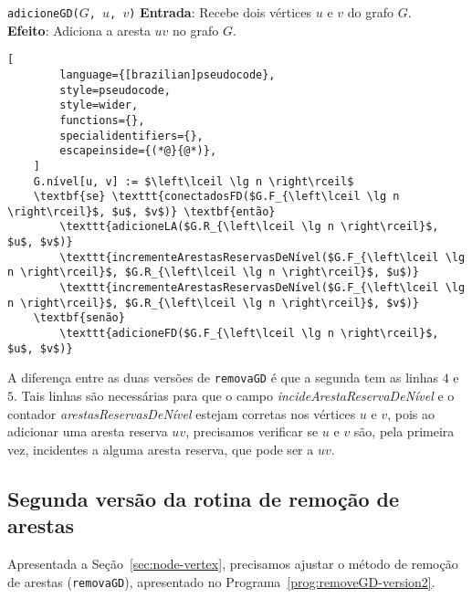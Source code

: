 \begin{programruledcaption}{\texttt{adicioneGD($G$, $u$, $v$)} \label{prog:addGD-version2}}
    \noindent\textbf{Entrada}: Recebe dois vértices $u$ e $v$ do grafo $G$. \\
    \textbf{Efeito}: Adiciona a aresta $uv$ no grafo $G$.
    \vspace{-0.5\baselineskip}
    \begin{lstlisting}[
        language={[brazilian]pseudocode},
        style=pseudocode,
        style=wider,
        functions={},
        specialidentifiers={},
        escapeinside={(*@}{@*)},
    ]
    G.nível[u, v] := $\left\lceil \lg n \right\rceil$
    \textbf{se} \texttt{conectadosFD($G.F_{\left\lceil \lg n \right\rceil}$, $u$, $v$)} \textbf{então}
        \texttt{adicioneLA($G.R_{\left\lceil \lg n \right\rceil}$, $u$, $v$)}
        \texttt{incrementeArestasReservasDeNível($G.F_{\left\lceil \lg n \right\rceil}$, $G.R_{\left\lceil \lg n \right\rceil}$, $u$)}
        \texttt{incrementeArestasReservasDeNível($G.F_{\left\lceil \lg n \right\rceil}$, $G.R_{\left\lceil \lg n \right\rceil}$, $v$)}
    \textbf{senão}
        \texttt{adicioneFD($G.F_{\left\lceil \lg n \right\rceil}$, $u$, $v$)}
    \end{lstlisting}
    \vspace{-0.5\baselineskip}
\end{programruledcaption}

A diferença entre as duas versões de \texttt{removaGD} é que a segunda tem as linhas $4$ e $5$. Tais linhas são necessárias para que o campo \textit{incideArestaReservaDeNível} e o contador \textit{arestasReservasDeNível} estejam corretas nos vértices $u$ e $v$, pois ao adicionar uma aresta reserva $uv$, precisamos verificar se $u$ e $v$ são, pela primeira vez, incidentes a alguma aresta reserva, que pode ser a $uv$. 

\subsection{Segunda versão da rotina de remoção de arestas}
\label{sec:code-edge-removal-second-version}

Apresentada a Seção~\ref{sec:node-vertex}, precisamos ajustar o método de remoção de arestas (\texttt{removaGD}), apresentado no Programa~\ref{prog:removeGD-version2}. 

